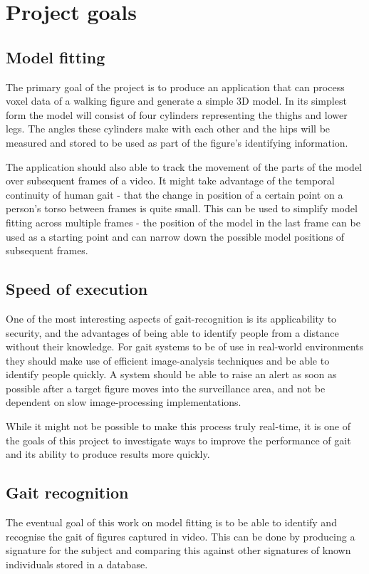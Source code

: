 \section{Project goals}

\subsection{Model fitting}
\label{Goals:ModelFitting}

The primary goal of the project is to produce an application that can process voxel data of a walking figure and generate a simple 3D model.
In its simplest form the model will consist of four cylinders representing the thighs and lower legs.
The angles these cylinders make with each other and the hips will be measured and stored to be used as part of the figure's identifying information.

The application should also able to track the movement of the parts of the model over subsequent frames of a video.
It might take advantage of the temporal continuity of human gait - that the change in position of a certain point on a person's torso between frames is quite small.
This can be used to simplify model fitting across multiple frames -
the position of the model in the last frame can be used as a starting point and can narrow down the possible model positions of subsequent frames.


\subsection{Speed of execution}

One of the most interesting aspects of gait-recognition is its applicability to security, and the advantages of being able to identify people from a distance without their knowledge.
For gait systems to be of use in real-world environments they should make use of efficient image-analysis techniques and be able to identify people quickly.
A system should be able to raise an alert as soon as possible after a target figure moves into the surveillance area, and not be dependent on slow image-processing implementations.

While it might not be possible to make this process truly real-time, it is one of the goals of this project to investigate ways to improve the performance of gait and its ability to produce results more quickly.


\subsection{Gait recognition}

The eventual goal of this work on model fitting is to be able to identify and recognise the gait of figures captured in video.
This can be done by producing a signature for the subject and comparing this against other signatures of known individuals stored in a database.

